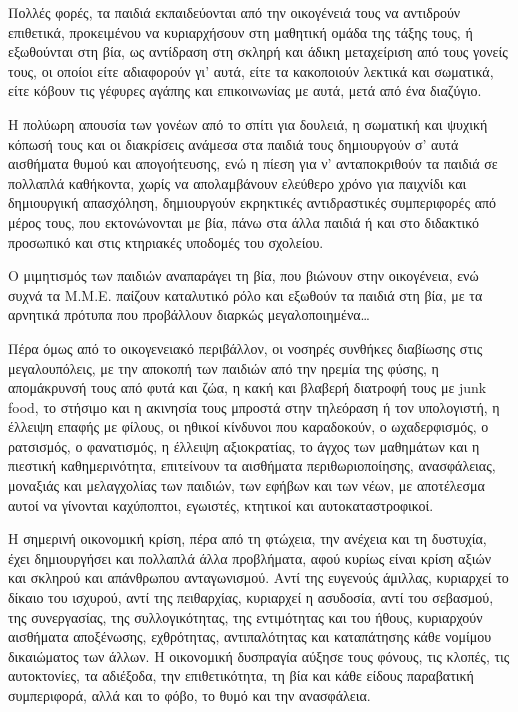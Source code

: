 \documentclass[12pt,a4paper,oneside]{book}
\begin{document}
\indent Πολλές φορές, τα παιδιά εκπαιδεύονται από την οικογένειά τους να
αντιδρούν επιθετικά, προκειμένου να κυριαρχήσουν στη μαθητική ομάδα της τάξης
τους, ή εξωθούνται στη βία, ως αντίδραση στη σκληρή και άδικη μεταχείριση από
τους γονείς τους, οι οποίοι είτε αδιαφορούν γι' αυτά, είτε τα κακοποιούν λεκτικά
και σωματικά, είτε κόβουν τις γέφυρες αγάπης και επικοινωνίας με αυτά, μετά από
ένα διαζύγιο.

\indent Η πολύωρη απουσία των γονέων από το σπίτι για δουλειά, η σωματική και
ψυχική κόπωσή τους και οι διακρίσεις ανάμεσα στα παιδιά τους δημιουργούν σ' αυτά
αισθήματα θυμού και απογοήτευσης, ενώ η πίεση για ν' ανταποκριθούν τα παιδιά σε
πολλαπλά καθήκοντα, χωρίς να απολαμβάνουν ελεύθερο χρόνο για παιχνίδι και
δημιουργική απασχόληση, δημιουργούν εκρηκτικές αντιδραστικές συμπεριφορές από
μέρος τους, που εκτονώνονται με βία, πάνω στα άλλα παιδιά ή και στο διδακτικό
προσωπικό και στις κτηριακές υποδομές του σχολείου.

\indent Ο μιμητισμός των παιδιών αναπαράγει τη βία, που βιώνουν στην οικογένεια,
ενώ συχνά τα Μ.Μ.Ε. παίζουν καταλυτικό ρόλο και εξωθούν τα παιδιά στη βία, με τα αρνητικά πρότυπα που προβάλλουν διαρκώς
μεγαλοποιημένα\ldots

\indent Πέρα όμως από το οικογενειακό περιβάλλον, οι νοσηρές συνθήκες διαβίωσης
στις μεγαλουπόλεις, με την αποκοπή των παιδιών από την ηρεμία της φύσης, η απομάκρυνσή τους από φυτά και ζώα, η κακή
και βλαβερή διατροφή τους με junk food, το στήσιμο και η ακινησία τους μπροστά
στην τηλεόραση ή τον υπολογιστή, η έλλειψη επαφής με φίλους, οι ηθικοί κίνδυνοι
που καραδοκούν, ο ωχαδερφισμός, ο ρατσισμός, ο φανατισμός, η έλλειψη
αξιοκρατίας, το άγχος των μαθημάτων και η πιεστική καθημερινότητα, επιτείνουν τα
αισθήματα περιθωριοποίησης, ανασφάλειας, μοναξιάς και μελαγχολίας των παιδιών,
των εφήβων και των νέων, με αποτέλεσμα αυτοί να γίνονται καχύποπτοι, εγωιστές,
κτητικοί και αυτοκαταστροφικοί.

\indent Η σημερινή οικονομική κρίση, πέρα από τη φτώχεια, την ανέχεια και τη
δυστυχία, έχει δημιουργήσει και πολλαπλά άλλα προβλήματα, αφού κυρίως είναι κρίση αξιών και σκληρού και απάνθρωπου
ανταγωνισμού. Αντί της ευγενούς άμιλλας, κυριαρχεί το δίκαιο του ισχυρού, αντί
της πειθαρχίας, κυριαρχεί η ασυδοσία, αντί του σεβασμού, της συνεργασίας, της
συλλογικότητας, της εντιμότητας και του ήθους, κυριαρχούν αισθήματα αποξένωσης,
εχθρότητας, αντιπαλότητας και καταπάτησης κάθε νομίμου δικαιώματος των άλλων. Η
οικονομική δυσπραγία αύξησε τους φόνους, τις κλοπές, τις αυτοκτονίες, τα
αδιέξοδα, την επιθετικότητα, τη βία και κάθε είδους παραβατική συμπεριφορά, αλλά
και το φόβο, το θυμό και την ανασφάλεια.
\end{document}
